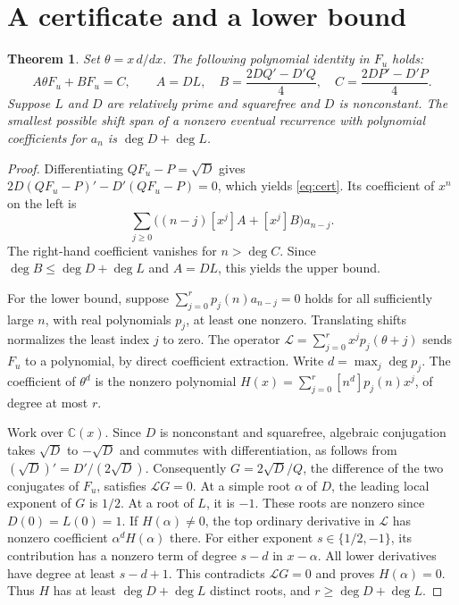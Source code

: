 \documentclass[11pt]{article}
\newtheorem{theorem}{Theorem}
\begin{document}
\section{A certificate and a lower bound}
\begin{theorem}
Set $\theta=x\,d/dx$. The following polynomial identity in $F_u$ holds:
\begin{equation}
 A\theta F_u+BF_u=C,\qquad
 A=DL,\quad B=\frac{2DQ'-D'Q}{4},\quad C=\frac{2DP'-D'P}{4}.
 \label{eq:cert}
\end{equation}
Suppose $L$ and $D$ are relatively prime and squarefree and $D$ is nonconstant. The smallest possible shift span of a nonzero eventual recurrence with polynomial coefficients for $a_n$ is $\deg D+\deg L$.
\end{theorem}
\begin{proof}
Differentiating $QF_u-P=\sqrt D$ gives $2D(QF_u-P)' - D'(QF_u-P)=0$, which yields \eqref{eq:cert}. Its coefficient of $x^n$ on the left is
\[
 \sum_{j\geq0}\bigl((n-j)[x^j]A+[x^j]B\bigr)a_{n-j}.
\]
The right-hand coefficient vanishes for $n>\deg C$. Since $\deg B\leq\deg D+\deg L$ and $A=DL$, this yields the upper bound.

For the lower bound, suppose $\sum_{j=0}^r p_j(n)a_{n-j}=0$ holds for all sufficiently large $n$, with real polynomials $p_j$, at least one nonzero. Translating shifts normalizes the least index $j$ to zero. The operator $\mathcal L=\sum_{j=0}^r x^j p_j(\theta+j)$ sends $F_u$ to a polynomial, by direct coefficient extraction. Write $d=\max_j\deg p_j$. The coefficient of $\theta^d$ is the nonzero polynomial $H(x)=\sum_{j=0}^r [n^d]p_j(n)x^j$, of degree at most $r$.

Work over $\mathbb C(x)$. Since $D$ is nonconstant and squarefree, algebraic conjugation takes $\sqrt D$ to $-\sqrt D$ and commutes with differentiation, as follows from $(\sqrt D)'=D'/(2\sqrt D)$. Consequently $G=2\sqrt D/Q$, the difference of the two conjugates of $F_u$, satisfies $\mathcal LG=0$. At a simple root $\alpha$ of $D$, the leading local exponent of $G$ is $1/2$. At a root of $L$, it is $-1$. These roots are nonzero since $D(0)=L(0)=1$. If $H(\alpha)\ne 0$, the top ordinary derivative in $\mathcal L$ has nonzero coefficient $\alpha^d H(\alpha)$ there. For either exponent $s\in\{1/2,-1\}$, its contribution has a nonzero term of degree $s-d$ in $x-\alpha$. All lower derivatives have degree at least $s-d+1$. This contradicts $\mathcal L G=0$ and proves $H(\alpha)=0$. Thus $H$ has at least $\deg D+\deg L$ distinct roots, and $r\geq\deg D+\deg L$.
\end{proof}
\end{document}
